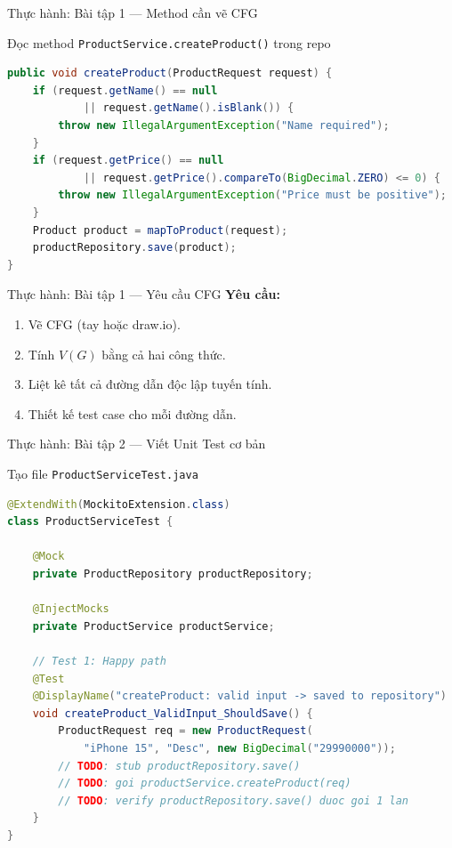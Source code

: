 \documentclass[aspectratio=169,12pt]{beamer}
\begin{document}
\begin{frame}[fragile,shrink=12]{Thực hành: Bài tập 1 --- Method cần vẽ CFG}
  \begin{block}{Đọc method \texttt{ProductService.createProduct()} trong repo}
\begin{lstlisting}[language=java,style=nonumber]
public void createProduct(ProductRequest request) {
    if (request.getName() == null
            || request.getName().isBlank()) {
        throw new IllegalArgumentException("Name required");
    }
    if (request.getPrice() == null
            || request.getPrice().compareTo(BigDecimal.ZERO) <= 0) {
        throw new IllegalArgumentException("Price must be positive");
    }
    Product product = mapToProduct(request);
    productRepository.save(product);
}
\end{lstlisting}
  \end{block}
\end{frame}

\begin{frame}[shrink=12]{Thực hành: Bài tập 1 --- Yêu cầu CFG}
  \textbf{Yêu cầu:}
  \begin{enumerate}
    \item Vẽ CFG (tay hoặc draw.io).
    \item Tính $V(G)$ bằng cả hai công thức.
    \item Liệt kê tất cả đường dẫn độc lập tuyến tính.
    \item Thiết kế test case cho mỗi đường dẫn.
  \end{enumerate}
\end{frame}

\begin{frame}[fragile,shrink=12]{Thực hành: Bài tập 2 --- Viết Unit Test cơ bản}
  \begin{block}{Tạo file \texttt{ProductServiceTest.java}}
\begin{lstlisting}[language=java]
@ExtendWith(MockitoExtension.class)
class ProductServiceTest {

    @Mock
    private ProductRepository productRepository;

    @InjectMocks
    private ProductService productService;

    // Test 1: Happy path
    @Test
    @DisplayName("createProduct: valid input -> saved to repository")
    void createProduct_ValidInput_ShouldSave() {
        ProductRequest req = new ProductRequest(
            "iPhone 15", "Desc", new BigDecimal("29990000"));
        // TODO: stub productRepository.save()
        // TODO: goi productService.createProduct(req)
        // TODO: verify productRepository.save() duoc goi 1 lan
    }
}
\end{lstlisting}
  \end{block}
\end{frame}
\end{document}
